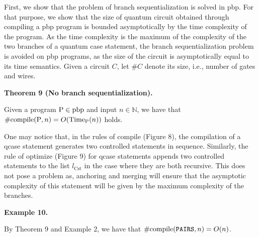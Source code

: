  
First, we show that the problem of branch sequentialization is solved in pbp. For that purpose, we show that the size of quantum circuit obtained through compiling a pbp program is bounded asymptotically by the time complexity of the program. As the time complexity is the maximum of the complexity of the two branches of a quantum case statement, the branch sequentialization problem is avoided on pbp programs, as the size of the circuit is asymptotically equal to its time semantics. Given a circuit $C$, let $\#C$ denote its size, i.e., number of gates and wires.\par
 
 
 
\par\medskip\noindent\textbf{Theorem 9 (No branch sequentialization).}\par
 
 
Given a program $\mathrm{P}\in\textnormal{{pbp}}{}$ and input $n\in\mathbb{N}$, we have that $\#\textnormal{{{compile}}{}}(\mathrm{P},n)=O(\textnormal{Time}_{\mathrm{P}}(n))$ holds.\par
 
 
 
 
One may notice that, in the rules of compile (Figure 8), the compilation of a qcase statement generates two controlled statements in sequence. Similarly, the rule of optimize (Figure 9) for qcase statements appends two controlled statements to the list $l_{\mathrm{Cst}}$ in the case where they are both recursive. This does not pose a problem as, anchoring and merging will ensure that the asymptotic complexity of this statement will be given by the maximum complexity of the branches.\par
 
 
 
\par\medskip\noindent\textbf{Example 10.}\par
 
 
By Theorem 9 and Example 2, we have that $\#\textnormal{{compile}}{}(\texttt{PAIRS},n)=O(n)$.\par
 
